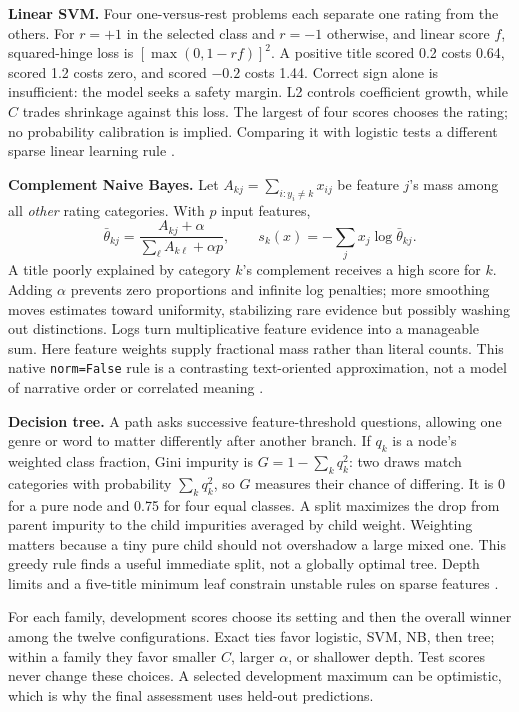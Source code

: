 \documentclass[11pt,letterpaper]{article}
\begin{document}
\textbf{Linear SVM.} Four one-versus-rest problems each separate one rating from the others. For $r=+1$ in the selected class and $r=-1$ otherwise, and linear score $f$, squared-hinge loss is $[\max(0,1-rf)]^2$. A positive title scored 0.2 costs 0.64, scored 1.2 costs zero, and scored $-0.2$ costs 1.44. Correct sign alone is insufficient: the model seeks a safety margin. L2 controls coefficient growth, while $C$ trades shrinkage against this loss. The largest of four scores chooses the rating; no probability calibration is implied. Comparing it with logistic tests a different sparse linear learning rule \cite{svm}.

\textbf{Complement Naive Bayes.} Let $A_{kj}=\sum_{i:y_i\ne k}x_{ij}$ be feature $j$'s mass among all \emph{other} rating categories. With $p$ input features,
\[
\bar\theta_{kj}=\frac{A_{kj}+\alpha}{\sum_\ell A_{k\ell}+\alpha p},\qquad
s_k(x)=-\sum_jx_j\log\bar\theta_{kj}.
\]
A title poorly explained by category $k$'s complement receives a high score for $k$. Adding $\alpha$ prevents zero proportions and infinite log penalties; more smoothing moves estimates toward uniformity, stabilizing rare evidence but possibly washing out distinctions. Logs turn multiplicative feature evidence into a manageable sum. Here feature weights supply fractional mass rather than literal counts. This native \texttt{norm=False} rule is a contrasting text-oriented approximation, not a model of narrative order or correlated meaning \cite{cnb}.

\textbf{Decision tree.} A path asks successive feature-threshold questions, allowing one genre or word to matter differently after another branch. If $q_k$ is a node's weighted class fraction, Gini impurity is $G=1-\sum_kq_k^2$: two draws match categories with probability $\sum_kq_k^2$, so $G$ measures their chance of differing. It is 0 for a pure node and 0.75 for four equal classes. A split maximizes the drop from parent impurity to the child impurities averaged by child weight. Weighting matters because a tiny pure child should not overshadow a large mixed one. This greedy rule finds a useful immediate split, not a globally optimal tree. Depth limits and a five-title minimum leaf constrain unstable rules on sparse features \cite{tree}.

For each family, development scores choose its setting and then the overall winner among the twelve configurations. Exact ties favor logistic, SVM, NB, then tree; within a family they favor smaller $C$, larger $\alpha$, or shallower depth. Test scores never change these choices. A selected development maximum can be optimistic, which is why the final assessment uses held-out predictions.
\end{document}
